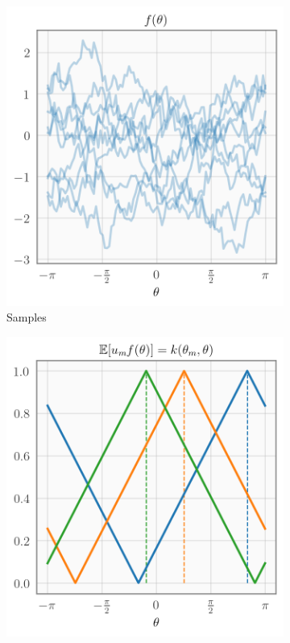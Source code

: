 \begin{figure}[tbh!]
  \centering
\begin{subfigure}{0.3\textwidth}
  \includegraphics[width=\textwidth]{heaviside2}
  \caption{Samples}
  \label{fig:heaviside1}
\end{subfigure}\hfil %
\begin{subfigure}{0.3\textwidth}
  \includegraphics[width=\textwidth]{heaviside1}

\end{subfigure}
\end{figure}
